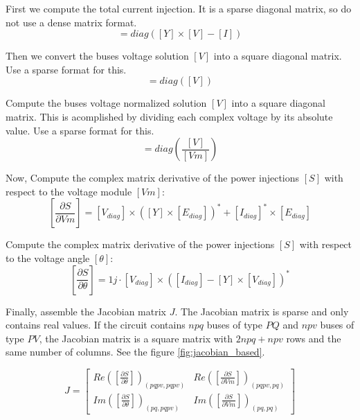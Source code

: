 \documentclass[nols,a4paper,twoside,symmetric,notoc,fleqn]{tufte-book}
\begin{document}
First we compute the total current injection. It is a sparse diagonal matrix, so do not use a dense matrix format.
\begin{equation}
[I_{diag}] = diag([Y] \times [V] - [I])
\end{equation}

Then we convert the buses voltage solution $[V]$ into a square diagonal matrix. Use a sparse format for this.
\begin{equation}
[V_{diag}] = diag([V])
\end{equation}

Compute the buses voltage normalized solution $[V]$ into a square diagonal matrix. This is acomplished by dividing each complex voltage by its absolute value. Use a sparse format for this.
\begin{equation}
[E_{diag}] = diag\left(\frac{[V]}{[Vm]}\right)
\end{equation}


Now, Compute the complex matrix derivative of the power injections $[S]$ with respect to the voltage module $[Vm]$:
\begin{equation}
\left[\frac{\partial S}{\partial Vm}\right] = [V_{diag}] \times \left([Y] \times [E_{diag}] \right)^* + [I_{diag}]^* \times  [E_{diag}]
\end{equation}
    
Compute the complex matrix derivative of the power injections $[S]$ with respect to the voltage angle $[\theta]$:
\begin{equation}
\left[\frac{\partial S}{\partial \theta}\right] = 1j \cdot [V_{diag}] \times  \left([I_{diag}] - [Y] \times [V_{diag}] \right)^*
\end{equation}

Finally, assemble the Jacobian matrix $J$. The Jacobian matrix is sparse and only contains real values. If the circuit contains $npq$ buses of type $PQ$ and $npv$ buses of type $PV$, the Jacobian matrix is a square matrix with $2 npq + npv$ rows and the same number of columns. See the figure \ref{fig:jacobian_based}.


\begin{equation}
J=
\left[
\begin{array}{cc}
Re\left(\left[\frac{\partial S}{\partial \theta}\right]\right)_{(pqpv, pqpv)} &
Re\left(\left[\frac{\partial S}{\partial Vm}\right]\right)_{(pqpv, pq)} \\
Im\left(\left[\frac{\partial S}{\partial \theta}\right]\right)_{(pq, pqpv)} &
Im\left(\left[\frac{\partial S}{\partial Vm}\right]\right)_{(pq,pq)}
\end{array}
\right]
\end{equation}
\end{document}

